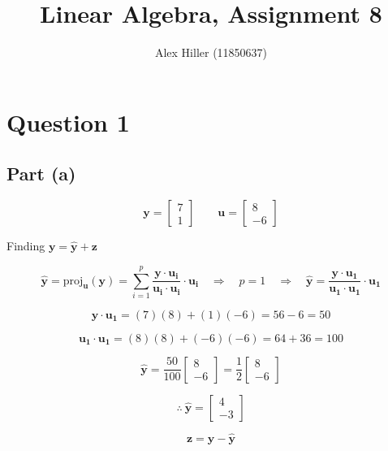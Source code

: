 \documentclass{article}
\author{Alex Hiller (11850637)}
\title{Linear Algebra, Assignment 8}
\begin{document}
\maketitle
\tableofcontents
\clearpage
\section{Question 1} 
\subsection{Part (a)} 
\[%
    \mathbf{y}
    =
    \begin{bmatrix} 7\\1 \end{bmatrix}
    \qquad
    \mathbf{u}
    =
    \begin{bmatrix} 8\\-6 \end{bmatrix}
\]%

Finding $\mathbf{y}=\mathbf{\hat{y}+\mathbf{z}}$

\[%
    \mathbf{\hat{y}} 
    =
    \text{proj}_{\mathbf{u}}\left(\mathbf{y}\right)
    =
    \sum_{i=1}^{p} \frac{\mathbf{y} \cdot \mathbf{u_i} }{\mathbf{u_i} \cdot
    \mathbf{u_i}}  \cdot \mathbf{u_i}
    \quad
    \Rightarrow 
    \quad
    p=1
    \quad 
    \Rightarrow 
    \quad 
    \mathbf{\hat{y}}
    =
    \frac{\mathbf{y} \cdot \mathbf{u_1}}{\mathbf{u_1}  \cdot \mathbf{u_1}}
    \cdot \mathbf{u_1}
\]%

\[%
    \mathbf{y} \cdot \mathbf{u_1} 
    =
    (7)(8)+(1)(-6)
    =
    56-6
    =
    50
\]%


\[%
    \mathbf{u_1} \cdot \mathbf{u_1}
    =
    (8)(8)+(-6)(-6)
    =
    64+36
    =
    100
\]%

\[%
    \mathbf{\hat{y}}
    =
    \frac{50}{100} 
    \begin{bmatrix} 8\\-6 \end{bmatrix}
    =
    \frac{1}{2} 
    \begin{bmatrix} 8\\-6 \end{bmatrix}
\]%

\[%
    \therefore \
    \mathbf{\hat{y}}=
    \begin{bmatrix} 4\\-3 \end{bmatrix}
\]%


\[%
    \mathbf{z}
    =
    \mathbf{y}
    -
    \mathbf{\hat{y}}
\]%
\end{document}

